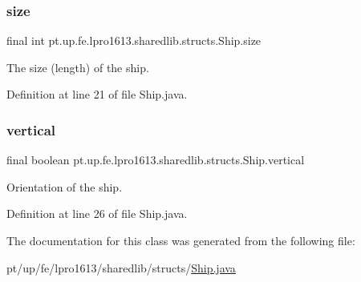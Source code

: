 \subsubsection{\texorpdfstring{size}{size}}
{\footnotesize\ttfamily final int pt.\+up.\+fe.\+lpro1613.\+sharedlib.\+structs.\+Ship.\+size}

The size (length) of the ship. 

Definition at line 21 of file Ship.\+java.

\hypertarget{classpt_1_1up_1_1fe_1_1lpro1613_1_1sharedlib_1_1structs_1_1_ship_a11c34815f1fadf10af31516ed990d84c}{}\label{classpt_1_1up_1_1fe_1_1lpro1613_1_1sharedlib_1_1structs_1_1_ship_a11c34815f1fadf10af31516ed990d84c} 
\subsubsection{\texorpdfstring{vertical}{vertical}}
{\footnotesize\ttfamily final boolean pt.\+up.\+fe.\+lpro1613.\+sharedlib.\+structs.\+Ship.\+vertical}

Orientation of the ship. 

Definition at line 26 of file Ship.\+java.



The documentation for this class was generated from the following file\+:\begin{DoxyCompactItemize}
\item 
pt/up/fe/lpro1613/sharedlib/structs/\hyperlink{_ship_8java}{Ship.\+java}\end{DoxyCompactItemize}
